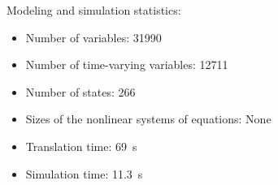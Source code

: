 \begin{contextbox}
  Modeling and simulation statistics:
  \begin{itemize}
    \item Number of variables: 31990
    \item Number of time-varying variables: 12711
    \item Number of states: 266
    \item Sizes of the nonlinear systems of equations: None
    \item Translation time: \SI{69}{s}
    \item Simulation time: \SI{11.3}{s}
  \end{itemize}
\end{contextbox}